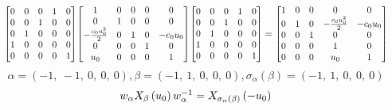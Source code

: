 \documentclass[11pt]{article}
\theoremstyle{definition}
\begin{document}
\[
\scaletoalign{\textwidth}{{\left[\begin{matrix}0 & 0 & 0 & 1 & 0\\0 & 0 & 1 & 0 & 0\\0 & 1 & 0 & 0 & 0\\1 & 0 & 0 & 0 & 0\\0 & 0 & 0 & 0 & 1\end{matrix}\right]} {\left[\begin{matrix}1 & 0 & 0 & 0 & 0\\0 & 1 & 0 & 0 & 0\\- \frac{c_{0} u_{0}^{2}}{2} & 0 & 1 & 0 & - c_{0} u_{0}\\0 & 0 & 0 & 1 & 0\\u_{0} & 0 & 0 & 0 & 1\end{matrix}\right]} {\left[\begin{matrix}0 & 0 & 0 & 1 & 0\\0 & 0 & 1 & 0 & 0\\0 & 1 & 0 & 0 & 0\\1 & 0 & 0 & 0 & 0\\0 & 0 & 0 & 0 & 1\end{matrix}\right]} = {\left[\begin{matrix}1 & 0 & 0 & 0 & 0\\0 & 1 & 0 & - \frac{c_{0} u_{0}^{2}}{2} & - c_{0} u_{0}\\0 & 0 & 1 & 0 & 0\\0 & 0 & 0 & 1 & 0\\0 & 0 & 0 & u_{0} & 1\end{matrix}\right]}}
\]
\[
\alpha = \left( -1, \  -1, \  0, \  0, \  0\right), \beta = \left( -1, \  1, \  0, \  0, \  0\right), \sigma_{\alpha}(\beta) = \left( -1, \  1, \  0, \  0, \  0\right)
\]
\[
\scaletoalign{\textwidth}{w_{\alpha} X_{\beta}\left(u_{0}\right) w_{\alpha}^{-1} = X_{\sigma_{\alpha}\left(\beta\right)}\left(- u_{0}\right)}
\]
\end{document}
